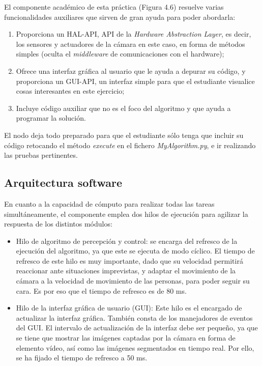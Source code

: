 El componente académico de esta práctica (Figura 4.6) resuelve varias funcionalidades auxiliares que sirven de gran ayuda para poder abordarla:

\begin{enumerate}[label=\alph*)]
	\item Proporciona un HAL-API, API de la \textit{Hardware Abstraction Layer}, es decir, los sensores y
actuadores de la cámara en este caso, en forma de métodos simples (oculta el \textit{middleware} de comunicaciones con el hardware);  
	\item Ofrece una interfaz gráfica al usuario que le ayuda a depurar su código, y proporciona un GUI-API, un interfaz simple para que el estudiante visualice cosas interesantes en este ejercicio; 
	\item Incluye código auxiliar que no es el foco del algoritmo y que ayuda a programar la solución.
\end{enumerate}

El nodo deja todo preparado para que el estudiante sólo tenga que incluir su código retocando el método \textit{execute} en el fichero \textit{MyAlgorithm.py}, e ir realizando las pruebas pertinentes.

\subsection{Arquitectura software}
En cuanto a la capacidad de cómputo para realizar todas las tareas simultáneamente, el componente emplea dos hilos de ejecución para agilizar la respuesta de los distintos módulos:
\begin{itemize}
	\renewcommand{\labelitemi}{$\to$}
	\item Hilo de algoritmo de percepción y control: se encarga del refresco de la ejecución del algoritmo, ya que este se ejecuta de modo cíclico. El tiempo de refresco de este hilo es muy importante, dado que su velocidad permitirá reaccionar ante situaciones imprevistas, y adaptar el movimiento de la cámara a la velocidad de movimiento de las personas, para poder seguir su cara. Es por eso que el tiempo de refresco es de 80 ms.
	\item Hilo de la interfaz gráfica de usuario (GUI): Este hilo es el encargado de actualizar la interfaz gráfica. También consta de los manejadores de eventos del GUI. El intervalo de actualización de la interfaz debe ser pequeño, ya que se tiene que mostrar las imágenes captadas por la cámara en forma de elemento vídeo, así como las imágenes segmentados en tiempo real. Por ello, se ha fijado el tiempo de refresco a 50 ms.
\end{itemize}

